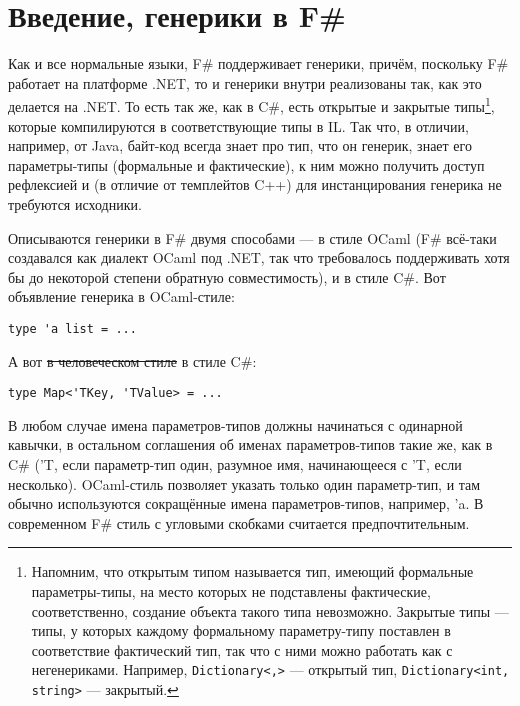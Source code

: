 \documentclass{../../text-style}
\begin{document}
\maketitle
\thispagestyle{empty}

\section{Введение, генерики в F\#}

Как и все нормальные языки, F\# поддерживает генерики, причём, поскольку F\# работает на платформе .NET, то и генерики внутри реализованы так, как это делается на .NET. То есть так же, как в C\#, есть открытые и закрытые типы\footnote{Напомним, что открытым типом называется тип, имеющий формальные параметры-типы, на место которых не подставлены фактические, соответственно, создание объекта такого типа невозможно. Закрытые типы --- типы, у которых каждому формальному параметру-типу поставлен в соответствие фактический тип, так что с ними можно работать как с негенериками. Например, \texttt{Dictionary<,>} --- открытый тип, \texttt{Dictionary<int, string>} --- закрытый.}, которые компилируются в соответствующие типы в IL. Так что, в отличии, например, от Java, байт-код всегда знает про тип, что он генерик, знает его параметры-типы (формальные и фактические), к ним можно получить доступ рефлексией и (в отличие от темплейтов C++) для инстанцирования генерика не требуются исходники.

Описываются генерики в F\# двумя способами --- в стиле OCaml (F\# всё-таки создавался как диалект OCaml под .NET, так что требовалось поддерживать хотя бы до некоторой степени обратную совместимость), и в стиле C\#. Вот объявление генерика в OCaml-стиле:

\begin{verbatim}
type 'a list = ...
\end{verbatim}

А вот \sout{в человеческом стиле} в стиле C\#:

\begin{verbatim}
type Map<'TKey, 'TValue> = ...
\end{verbatim}

В любом случае имена параметров-типов должны начинаться с одинарной кавычки, в остальном соглашения об именах параметров-типов такие же, как в C\# ('T, если параметр-тип один, разумное имя, начинающееся с 'T, если несколько). OCaml-стиль позволяет указать только один параметр-тип, и там обычно используются сокращённые имена параметров-типов, например, 'a. В современном F\# стиль с угловыми скобками считается предпочтительным.
\end{document}
